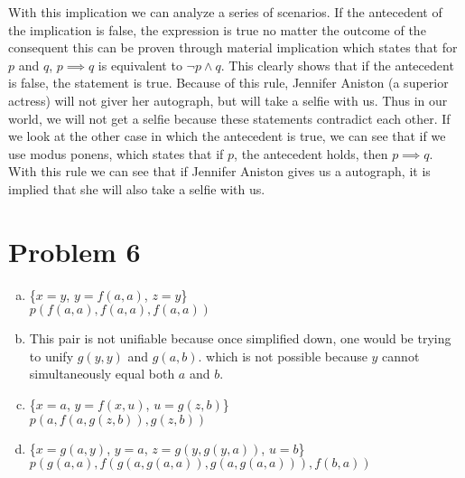 \documentclass[12pt]{article}%
\begin{document}
    With this implication we can analyze a series of scenarios. If the antecedent of the implication is false, the expression is true no matter the outcome of the consequent this can be proven through material implication which states that for $p$ and $q$, $p \implies q$ is equivalent to $\neg p \land q$. This clearly shows that if the antecedent is false, the statement is true. Because of this rule, Jennifer Aniston (a superior actress) will not giver her autograph, but will take a selfie with us. Thus in our world, we will not get a selfie because these statements contradict each other. If we look at the other case in which the antecedent is true, we can see that if we use modus ponens, which states that if $p$, the antecedent holds, then $p \implies q$. With this rule we can see that if Jennifer Aniston gives us a autograph, it is implied that she will also take a selfie with us.

\section*{Problem 6}
\begin{enumerate}[a.]
    \item \{$x = y$, $y = f(a,a)$, $z = y$\} \\
    $p(f(a,a), f(a,a), f(a,a))$
    \item This pair is not unifiable because once simplified down, one would be trying to unify $g(y,y)$ and $g(a,b)$. which is not possible because $y$ cannot simultaneously equal both $a$ and $b$.
    \item \{$x = a$, $y = f(x, u)$, $u = g(z,b)$\}\\
    $p(a, f(a,g(z,b)), g(z,b))$
    \item \{$x = g(a,y)$, $y = a$, $z = g(y, g(y,a))$, $u = b$\}\\
    $p(g(a,a), f(g(a,g(a,a)), g(a,g(a,a))), f(b,a))$
\end{enumerate}
\end{document}
